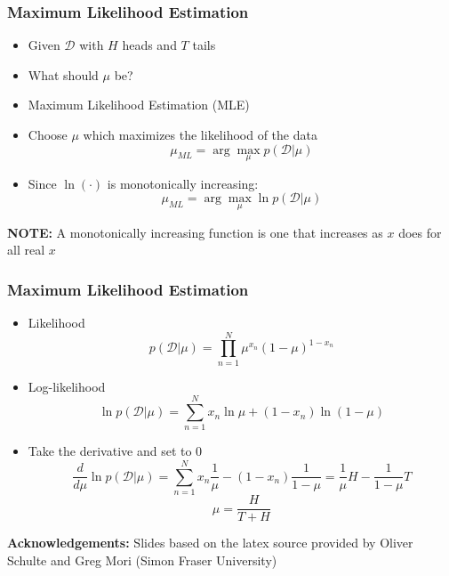 \documentclass{beamer}
\begin{document}
\begin{frame}
  \frametitle{Maximum Likelihood Estimation}
  \begin{itemize}
  \item Given $\mathcal{D}$ with $H$ heads and $T$ tails
  \item What should $\mu$ be?
  \item Maximum Likelihood Estimation (MLE)
  \item Choose $\mu$ which maximizes the likelihood of the data
    \[ \mu_{ML} = \arg \max_{\mu} p(\mathcal{D}|\mu) \]
  \item Since $\ln(\cdot)$ is monotonically increasing:
     \[ \mu_{ML} = \arg \max_{\mu} \ln p(\mathcal{D}|\mu) \]
  \end{itemize}
  \tiny
  \textbf{NOTE:} A monotonically increasing function is one that increases as $x$ does for all real $x$
\end{frame}

\begin{frame}
  \frametitle{Maximum Likelihood Estimation}
  \begin{itemize}
  \item Likelihood
    \[ p(\mathcal{D}|\mu) = \prod_{n=1}^{N} \mu^{x_n} (1-\mu)^{1-x_n} \]
  \item Log-likelihood
    \[ \ln p(\mathcal{D}|\mu) = \sum_{n=1}^{N} x_n \ln \mu + (1-x_n) \ln (1-\mu) \]
  \item Take the derivative and set to 0 \pause
    \[ \frac{d}{d \mu } \ln p(\mathcal{D}|\mu) = \sum_{n=1}^{N} x_n \frac{1}{\mu} - (1-x_n) \frac{1}{1-\mu}  = \frac{1}{\mu} H - \frac{1}{1-\mu} T \]
    \[ \mu = \frac{H}{T + H} \]
  \end{itemize}
\end{frame}

\begin{frame}
\textbf{Acknowledgements:} Slides based on the latex source provided by Oliver Schulte and Greg Mori (Simon Fraser University)
\end{frame}
\end{document}
